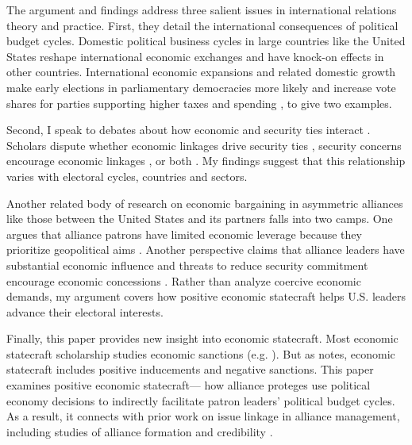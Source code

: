 \documentclass[12pt]{article}
\begin{document}
The argument and findings address three salient issues in international relations theory and practice. 
First, they detail the international consequences of political budget cycles. 
Domestic political business cycles in large countries like the United States reshape international economic exchanges and have knock-on effects in other countries.
International economic expansions and related domestic growth make early elections in parliamentary democracies more likely \citep{Kayser2006} and increase vote shares for parties supporting higher taxes and spending \citep{Kayser2009}, to give two examples.


Second, I speak to debates about how economic and security ties interact \citep{Mastanduno2009, Poast2019}. 
Scholars dispute whether economic linkages drive security ties \citep{BiglaiserDeRouen2007, Fordham2010, Kimball2010}, security concerns encourage economic linkages \citep{Gowa1995, Li2003, LongLeeds2006, GowaMansfield2004}, or both \citep{BiglaiserDeRouen2009, KinneBunte2018}. 
My findings suggest that this relationship varies with electoral cycles, countries and sectors.


Another related body of research on economic bargaining in asymmetric alliances like those between the United States and its partners falls into two camps. 
One argues that alliance patrons have limited economic leverage because they prioritize geopolitical aims \citep{Drezner2013, WolfordKim2017}.
Another perspective claims that alliance leaders have substantial economic influence \citep{Norrlof2010, Brooksetal2013} and threats to reduce security commitment encourage economic concessions \citep[pg. 122]{Oatley2015}.
Rather than analyze coercive economic demands, my argument covers how positive economic statecraft helps U.S. leaders advance their electoral interests.


Finally, this paper provides new insight into economic statecraft. 
Most economic statecraft scholarship studies economic sanctions (e.g. \cite{Marinov2005, Allen2008, Escriba-FolchWright2010}).
But as \citet{Baldwin2020} notes, economic statecraft includes positive inducements and negative sanctions. 
This paper examines positive economic statecraft--- how alliance proteges use political economy decisions to indirectly facilitate patron leaders' political budget cycles.
As a result, it connects with prior work on issue linkage in alliance management, including studies of alliance formation \citep{Poast2012} and credibility \citep{Davis2008, Poast2013}. 
\end{document}
